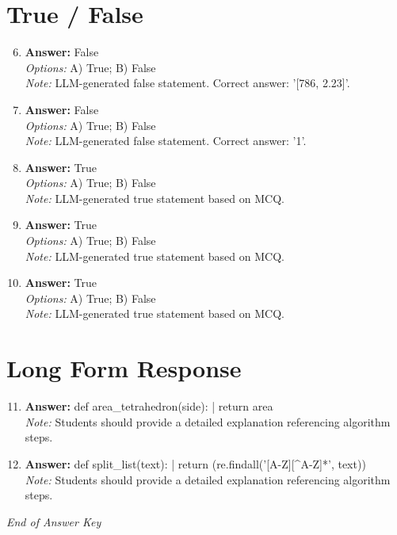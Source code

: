 \documentclass[12pt]{article}
\begin{document}
\section*{True / False}
\begin{enumerate}[label=\arabic*.]
\setcounter{enumi}{5}
\item \textbf{Answer:} False
\\ \textit{Options:} A) True; B) False
\\ \textit{Note:} LLM-generated false statement. Correct answer: '[786, 2.23]'.
\item \textbf{Answer:} False
\\ \textit{Options:} A) True; B) False
\\ \textit{Note:} LLM-generated false statement. Correct answer: '1'.
\item \textbf{Answer:} True
\\ \textit{Options:} A) True; B) False
\\ \textit{Note:} LLM-generated true statement based on MCQ.
\item \textbf{Answer:} True
\\ \textit{Options:} A) True; B) False
\\ \textit{Note:} LLM-generated true statement based on MCQ.
\item \textbf{Answer:} True
\\ \textit{Options:} A) True; B) False
\\ \textit{Note:} LLM-generated true statement based on MCQ.
\end{enumerate}

\section*{Long Form Response}
\begin{enumerate}[label=\arabic*.]
\setcounter{enumi}{10}
\item \textbf{Answer:} def area\_tetrahedron(side): | return area
\\ \textit{Note:} Students should provide a detailed explanation referencing algorithm steps.
\item \textbf{Answer:} def split\_list(text): | return (re.findall('[A-Z][^A-Z]*', text))
\\ \textit{Note:} Students should provide a detailed explanation referencing algorithm steps.
\end{enumerate}

\vfill
\noindent\textit{End of Answer Key}
\end{document}
